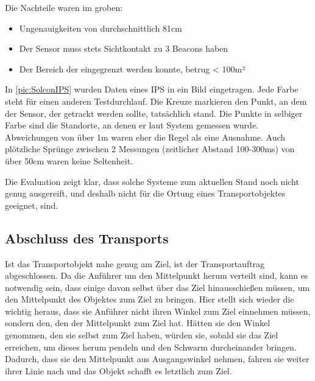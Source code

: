 \newpage
Die Nachteile waren im groben:

\begin{itemize}
	\item Ungenauigkeiten von durchschnittlich 81cm
	\item Der Sensor muss stets Sichtkontakt zu 3 Beacons haben
	\item Der Bereich der eingegrenzt werden konnte, betrug < 100m²
\end{itemize}


In \autoref{pic:SolconIPS} wurden Daten eines IPS in ein Bild eingetragen. Jede Farbe steht für einen anderen Testdurchlauf. Die Kreuze markieren den Punkt, an dem der Sensor, der getrackt werden sollte, tatsächlich stand. Die Punkte in selbiger Farbe sind die Standorte, an denen er laut System gemessen wurde. Abweichungen von über 1m waren eher die Regel als eine Ausnahme. Auch plötzliche Sprünge zwischen 2 Messungen (zeitlicher Abstand 100-300ms) von über 50cm waren keine Seltenheit.

Die Evaluation zeigt klar, dass solche Systeme zum aktuellen Stand noch nicht genug ausgereift, und deshalb nicht für die Ortung eines Transportobjektes geeignet, sind.

\subsection*{Abschluss des Transports}

Ist das Transportobjekt nahe genug am Ziel, ist der Transportauftrag abgeschlossen. Da die Anführer um den Mittelpunkt herum verteilt sind, kann es notwendig sein, dass einige davon selbst über das Ziel hinausschießen müssen, um den Mittelpunkt des Objektes zum Ziel zu bringen. Hier stellt sich wieder die wichtig heraus, dass sie Anführer nicht ihren Winkel zum Ziel einnehmen müssen, sondern den, den der Mittelpunkt zum Ziel hat. Hätten sie den Winkel genommen, den sie selbst zum Ziel haben, würden sie, sobald sie das Ziel erreichen, um dieses herum pendeln und den Schwarm durcheinander bringen. Dadurch, dass sie den Mittelpunkt aus Ausgangswinkel nehmen, fahren sie weiter ihrer Linie nach und das Objekt schafft es letztlich zum Ziel.


